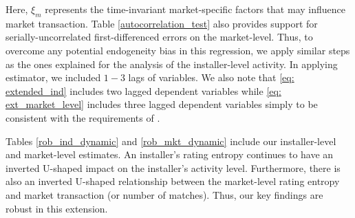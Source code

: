 \documentclass[mnsc,blindrev]{informs3}
\begin{document}
	Here, $\xi_{m}$ represents the time-invariant market-specific factors that may influence market transaction.  Table \ref{autocorrelation_test} also provides support for serially-uncorrelated first-differenced errors on the market-level. Thus, to overcome any potential endogeneity bias in this regression, we apply similar steps as the ones explained for the analysis of the installer-level activity. In applying  \cite{arellano1991some} estimator, we included $1-3$ lags of variables. We also note that \eqref{eq: extended_ind} includes two lagged dependent variables while \eqref{eq: ext_market_level} includes three lagged dependent variables simply to be consistent with the requirements of \cite{arellano1991some}.
	
	Tables \ref{rob_ind_dynamic} and \ref{rob_mkt_dynamic} include our installer-level and market-level estimates. An installer's rating entropy continues to have an inverted U-shaped impact on the installer's activity level. Furthermore, there is also an inverted U-shaped relationship between the market-level rating entropy and market transaction (or number of matches).  Thus, our key findings are robust in this extension.
	
	
	
	
\end{document}

